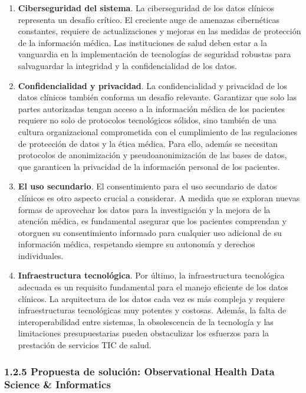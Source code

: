 \begin{enumerate}[label=\roman*.]
    \item \textbf{Ciberseguridad del sistema}. La ciberseguridad de los datos clínicos representa un desafío crítico. El creciente auge de amenazas cibernéticas constantes, requiere de actualizaciones y mejoras en las medidas de protección de la información médica. Las instituciones de salud deben estar a la vanguardia en la implementación de tecnologías de seguridad robustas para salvaguardar la integridad y la confidencialidad de los datos.
    \item \textbf{Confidencialidad y privacidad}.   La confidencialidad y privacidad de los datos clínicos también conforma un desafío relevante. Garantizar que solo las partes autorizadas tengan acceso a la información médica de los pacientes requiere no solo de protocolos tecnológicos sólidos, sino también de una cultura organizacional comprometida con el cumplimiento de las regulaciones de protección de datos y la ética médica. Para ello, además se necesitan protocolos de anonimización y pseudoanonimización de las bases de datos, que garanticen la privacidad de la información personal de los pacientes.
    \item \textbf{El uso secundario}. El consentimiento para el uso secundario de datos clínicos es otro aspecto crucial a considerar. A medida que se exploran nuevas formas de aprovechar los datos para la investigación y la mejora de la atención médica, es fundamental asegurar que los pacientes comprendan y otorguen su consentimiento informado para cualquier uso adicional de su información médica, respetando siempre su autonomía y derechos individuales.
    \item \textbf{Infraestructura tecnológica}. Por último, la infraestructura tecnológica adecuada es un requisito fundamental para el manejo eficiente de los datos clínicos. La arquitectura de los datos cada vez es más compleja y requiere infraestructuras tecnológicas muy potentes y costosas. Además, la falta de interoperabilidad entre sistemas, la obsolescencia de la tecnología y las limitaciones presupuestarias pueden obstaculizar los esfuerzos para la prestación de servicios TIC de salud.
    
\end{enumerate}

\subsubsection{1.2.5 Propuesta de solución: Observational Health Data Science \& Informatics}

